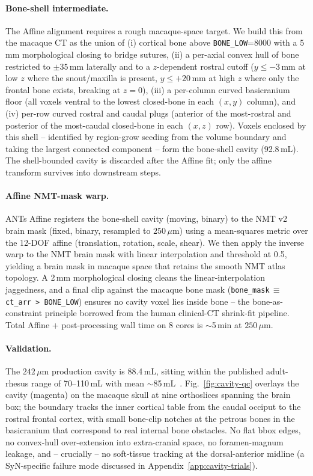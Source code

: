 \documentclass{compactarticle}
\begin{document}
\paragraph{Bone-shell intermediate.}
The Affine alignment requires a rough macaque-space target. We build
this from the macaque CT as the union of (i) cortical bone above
\texttt{BONE\_LOW}=8000 with a 5\,mm morphological closing to bridge
sutures, (ii) a per-axial convex hull of bone restricted to
$\pm 35$\,mm laterally and to a $z$-dependent rostral cutoff
($y\le-3$\,mm at low $z$ where the snout/maxilla is present,
$y\le+20$\,mm at high $z$ where only the frontal bone exists, breaking
at $z=0$), (iii) a per-column curved basicranium floor (all voxels
ventral to the lowest closed-bone in each $(x,y)$ column), and (iv)
per-row curved rostral and caudal plugs (anterior of the most-rostral
and posterior of the most-caudal closed-bone in each $(x,z)$ row).
Voxels enclosed by this shell -- identified by region-grow seeding
from the volume boundary and taking the largest connected component
-- form the bone-shell cavity (92.8\,mL). The shell-bounded cavity is
discarded after the Affine fit; only the affine transform survives
into downstream steps.

\paragraph{Affine NMT-mask warp.}
ANTs Affine registers the bone-shell cavity (moving, binary) to the
NMT v2 brain mask (fixed, binary, resampled to $250$\,$\mu$m) using a
mean-squares metric over the 12-DOF affine (translation, rotation,
scale, shear). We then apply the inverse warp to the NMT brain mask
with linear interpolation and threshold at 0.5, yielding a brain mask
in macaque space that retains the smooth NMT atlas topology. A 2\,mm
morphological closing cleans the linear-interpolation jaggedness, and
a final clip against the macaque bone mask
(\texttt{bone\_mask}\,$\equiv$\,\texttt{ct\_arr > BONE\_LOW}) ensures
no cavity voxel lies inside bone -- the bone-as-constraint principle
borrowed from the human clinical-CT shrink-fit pipeline. Total Affine
+ post-processing wall time on 8 cores is $\sim$5\,min at $250$\,$\mu$m.

\paragraph{Validation.}
The $242$\,$\mu$m production cavity is 88.4\,mL, sitting within the
published adult-rhesus range of 70--110\,mL with mean
$\sim$85\,mL~\cite{rhesus-volume}. Fig.~\ref{fig:cavity-qc} overlays
the cavity (magenta) on the macaque skull at nine orthoslices spanning
the brain box; the boundary tracks the inner cortical table from the
caudal occiput to the rostral frontal cortex, with small bone-clip
notches at the petrous bones in the basicranium that correspond to
real internal bone obstacles. No flat bbox edges, no convex-hull
over-extension into extra-cranial space, no foramen-magnum leakage,
and -- crucially -- no soft-tissue tracking at the dorsal-anterior
midline (a SyN-specific failure mode discussed in
Appendix~\ref{app:cavity-trials}).
\end{document}
